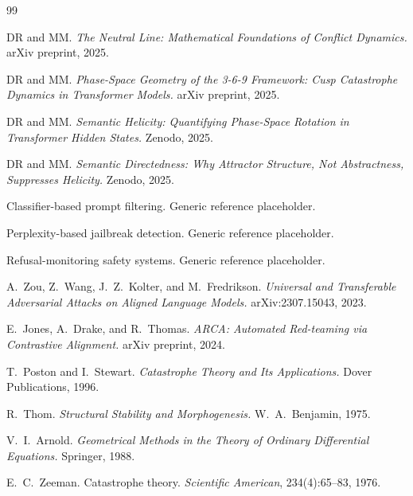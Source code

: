 \documentclass[12pt,a4paper]{article}
\begin{document}
\begin{thebibliography}{99}

DR and MM.
\textit{The Neutral Line: Mathematical Foundations of Conflict Dynamics.}
arXiv preprint, 2025.

DR and MM.
\textit{Phase-Space Geometry of the 3-6-9 Framework: Cusp Catastrophe Dynamics in Transformer Models.}
arXiv preprint, 2025.

DR and MM.
\textit{Semantic Helicity: Quantifying Phase-Space Rotation in Transformer Hidden States.}
Zenodo, 2025.

DR and MM.
\textit{Semantic Directedness: Why Attractor Structure, Not Abstractness, Suppresses Helicity.}
Zenodo, 2025.

Classifier-based prompt filtering.
Generic reference placeholder.

Perplexity-based jailbreak detection.
Generic reference placeholder.

Refusal-monitoring safety systems.
Generic reference placeholder.

A.~Zou, Z.~Wang, J.~Z.~Kolter, and M.~Fredrikson.
\textit{Universal and Transferable Adversarial Attacks on Aligned Language Models.}
arXiv:2307.15043, 2023.

E.~Jones, A.~Drake, and R.~Thomas.
\textit{ARCA: Automated Red-teaming via Contrastive Alignment.}
arXiv preprint, 2024.

T.~Poston and I.~Stewart.
\textit{Catastrophe Theory and Its Applications.}
Dover Publications, 1996.

R.~Thom.
\textit{Structural Stability and Morphogenesis.}
W.~A.~Benjamin, 1975.

V.~I.~Arnold.
\textit{Geometrical Methods in the Theory of Ordinary Differential Equations.}
Springer, 1988.

E.~C.~Zeeman.
Catastrophe theory.
\textit{Scientific American}, 234(4):65--83, 1976.

\end{thebibliography}
\end{document}
